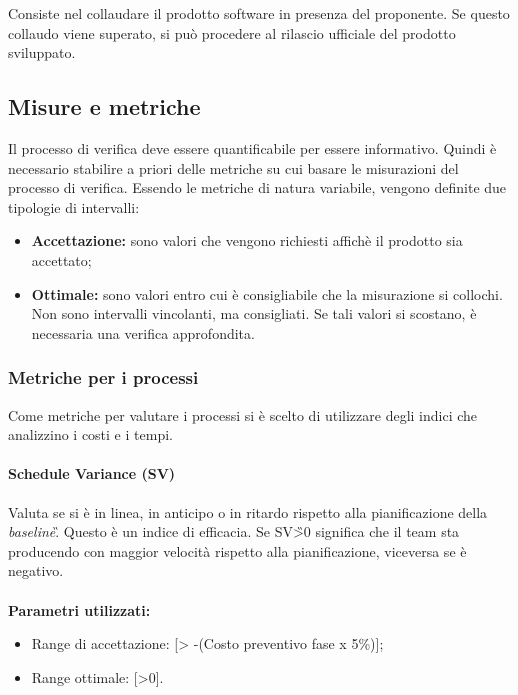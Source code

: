 Consiste nel collaudare il prodotto software in presenza del proponente. Se questo collaudo viene superato, si può procedere al rilascio ufficiale del prodotto sviluppato.

\subsection{Misure e metriche}

Il processo di verifica deve essere quantificabile per essere informativo. Quindi è necessario stabilire a priori delle metriche su cui basare le misurazioni del processo di verifica. Essendo le metriche di natura variabile, vengono definite due tipologie di intervalli:
\begin{itemize}
	\item \textbf{Accettazione:} sono valori che vengono richiesti affichè il prodotto sia accettato;
	\item \textbf{Ottimale:} sono valori entro cui è consigliabile che la 
	misurazione si collochi. Non sono intervalli vincolanti, ma consigliati. Se 
	tali valori si scostano, è necessaria una verifica approfondita.
\end{itemize}

\subsubsection{Metriche per i processi}
Come metriche per valutare i processi si è scelto di utilizzare degli indici che analizzino i costi e i tempi.

\paragraph{Schedule Variance (SV)}

Valuta se si è in linea, in anticipo o in ritardo rispetto alla pianificazione 
della \textit{baseline}\G. Questo è un indice di efficacia.\newline
Se SV\G>0 significa che il team sta producendo con maggior velocità 
rispetto alla pianificazione, viceversa se è negativo.\\\\
\textbf{Parametri utilizzati:}
\begin{itemize}
	\item Range di accettazione: [> -(Costo preventivo fase x 5\%)];
	\item Range ottimale: [>0].
\end{itemize}

